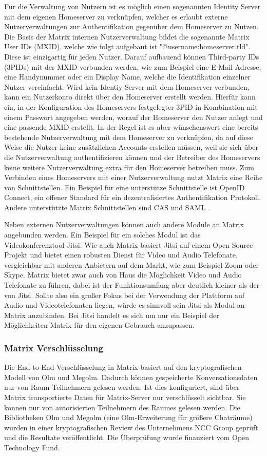 Für die Verwaltung von Nutzern ist es möglich einen sogenannten Identity Server mit dem eigenen Homeserver zu verknüpfen, welcher es erlaubt externe Nutzerverwaltungen zur Authentifikation gegenüber dem Homeserver zu Nutzen. Die Basis der Matrix internen Nutzerverwaltung bildet die sogenannte Matrix User IDs (MXID), welche wie folgt aufgebaut ist "@username:homeserver.tld". Diese ist einzigartig für jeden Nutzer. Darauf aufbauend können Third-party IDs (3PIDs) mit der MXID verbunden werden, wie zum Beispiel eine E-Mail-Adresse, eine Handynummer oder ein Display Name, welche die Identifikation einzelner Nutzer vereinfacht. Wird kein Identiy Server mit dem Homeserver verbunden, kann ein Nutzerkonto direkt über den Homeserver erstellt werden. Hierfür kann ein, in der Konfiguration des Homeservers festgelegter 3PID in Kombination mit einem Passwort angegeben werden, worauf der Homeserver den Nutzer anlegt und eine passende MXID erstellt. In der Regel ist es aber wünschenswert eine bereits bestehende Nutzerverwaltung mit dem Homeserver zu verknüpfen, da auf diese Weise die Nutzer keine zusätzlichen Accounts erstellen müssen, weil sie sich über die Nutzerverwaltung authentifizieren können und der Betreiber des Homeservers keine weitere Nutzerverwaltung extra für den Homeserver betreiben muss. Zum Verbinden eines Homeservers mit einer Nutzerverwaltung nutzt Matrix eine Reihe von Schnittstellen. Ein Beispiel für eine unterstütze Schnittstelle ist OpenID Connect, ein offener Standard für ein dezentralisiertes Authentifikation Protokoll. Andere unterstützte Matrix Schnittstellen sind CAS und SAML .

Neben externen Nutzerverwaltungen können auch andere Module an Matrix angebunden werden. Ein Beispiel für ein solches Modul ist das Videokonferenztool Jitsi. Wie auch Matrix basiert Jitsi auf einem Open Source Projekt und bietet einen robusten Dienst für Video und Audio Telefonate, vergleichbar mit anderen Anbietern auf dem Markt, wie zum Beispiel Zoom oder Skype. Matrix bietet zwar auch von Haus die Möglichkeit Video und Audio Telefonate zu führen, dabei ist der Funktionsumfang aber deutlich kleiner als der von Jitsi. Sollte also ein großer Fokus bei der Verwendung der Plattform auf Audio und Videotelefonaten liegen, würde es sinnvoll sein Jitsi als Modul an Matrix anzubinden. Bei Jitsi handelt es sich um nur ein Beispiel der Möglichkeiten Matrix für den eigenen Gebrauch anzupassen. 

\subsubsection{Matrix Verschlüsselung}\label{chapter:aemn}
Die End-to-End-Verschlüsselung in Matrix basiert auf den kryptografischen Modell von Olm und Megolm.
Dadurch können gespeicherte Konversationsdaten nur von Raum-Teilnehmern gelesen werden. Ist dies konfiguriert, sind über Matrix transportierte Daten für Matrix-Server nur verschlüsselt sichtbar. Sie können nur von autorisierten Teilnehmern des Raumes gelesen werden. Die Bibliotheken Olm und Megolm (eine Olm-Erweiterung für größere Chaträume) wurden in einer kryptografischen Review des Unternehmens NCC Group geprüft und die Resultate veröffentlicht. Die Überprüfung wurde finanziert vom Open Technology Fund.


